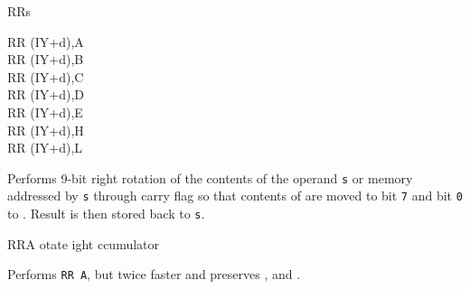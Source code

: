 \begin{basedescript}{
	\desclabelstyle{\multilinelabel}
	\desclabelwidth{3cm}}
\begin{DetailItem}{RR}{s}
\begin{DetailVariants}
			\columnbreak
			RR (IY+d),A\UNDOC\\
			RR (IY+d),B\UNDOC\\
			RR (IY+d),C\UNDOC\\
			RR (IY+d),D\UNDOC\\
			RR (IY+d),E\UNDOC\\
			RR (IY+d),H\UNDOC\\
			RR (IY+d),L\UNDOC
		\end{DetailVariants}

		Performs 9-bit right rotation of the contents of the operand {\tt s} or memory addressed by {\tt s} through carry flag \FlagCF{} so that contents of \FlagCF{} are moved to bit {\tt 7} and bit {\tt 0} to \FlagCF{}. Result is then stored back to {\tt s}.

		\begin{DetailEffects}[p]
			\FlagsRRr
		\end{DetailEffects}

		\begin{DetailEffectsFlags}
			\DetailFlagSF{\DetailFlagResultSign}
			\DetailFlagZF{\DetailFlagResultZero}
			\DetailFlagPV{\DetailFlagResultParity}
		\end{DetailEffectsFlags}

		\begin{DetailTiming}
		\end{DetailTiming}

	\end{DetailItem}


	\begin{DetailItem}{RRA}{}
		{otate ight ccumulator}
		{}

		Performs {\tt RR A}, but twice faster and preserves \FlagSF{}, \FlagZF{} and \FlagPV{}.

		\begin{DetailEffects}
			\FlagsRRA
		\end{DetailEffects}


\end{DetailItem}
\end{basedescript}

